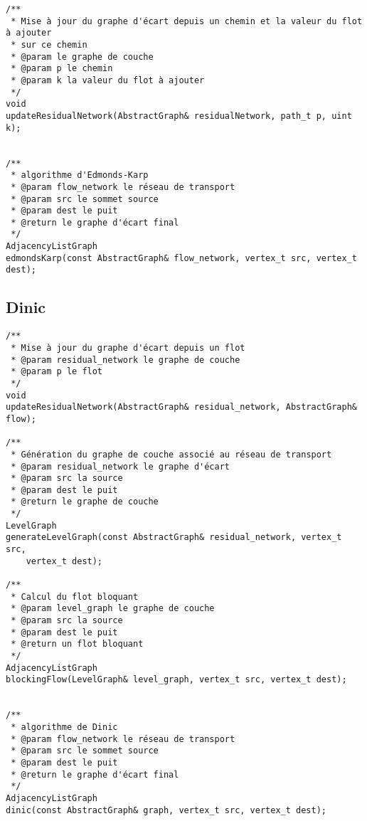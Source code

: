 \begin{verbatim}
/**
 * Mise à jour du graphe d'écart depuis un chemin et la valeur du flot à ajouter
 * sur ce chemin
 * @param le graphe de couche
 * @param p le chemin
 * @param k la valeur du flot à ajouter
 */
void
updateResidualNetwork(AbstractGraph& residualNetwork, path_t p, uint k);


/**
 * algorithme d'Edmonds-Karp
 * @param flow_network le réseau de transport
 * @param src le sommet source
 * @param dest le puit
 * @return le graphe d'écart final
 */
AdjacencyListGraph
edmondsKarp(const AbstractGraph& flow_network, vertex_t src, vertex_t dest);

\end{verbatim}

\subsection{Dinic}

\begin{verbatim}
/**
 * Mise à jour du graphe d'écart depuis un flot
 * @param residual_network le graphe de couche
 * @param p le flot
 */
void
updateResidualNetwork(AbstractGraph& residual_network, AbstractGraph& flow);

/**
 * Génération du graphe de couche associé au réseau de transport
 * @param residual_network le graphe d'écart
 * @param src la source
 * @param dest le puit
 * @return le graphe de couche
 */
LevelGraph
generateLevelGraph(const AbstractGraph& residual_network, vertex_t src,
    vertex_t dest);

/**
 * Calcul du flot bloquant
 * @param level_graph le graphe de couche
 * @param src la source
 * @param dest le puit
 * @return un flot bloquant
 */
AdjacencyListGraph
blockingFlow(LevelGraph& level_graph, vertex_t src, vertex_t dest);


/**
 * algorithme de Dinic
 * @param flow_network le réseau de transport
 * @param src le sommet source
 * @param dest le puit
 * @return le graphe d'écart final
 */
AdjacencyListGraph
dinic(const AbstractGraph& graph, vertex_t src, vertex_t dest);

\end{verbatim}
